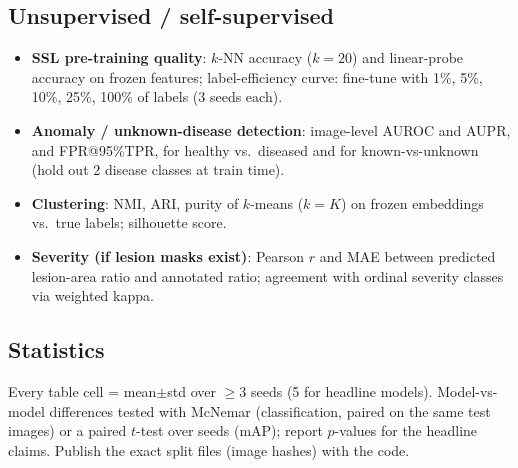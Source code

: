 \subsection{Unsupervised / self-supervised}
\begin{itemize}
  \item \textbf{SSL pre-training quality}: $k$-NN accuracy ($k{=}20$) and linear-probe accuracy on frozen features; label-efficiency curve: fine-tune with 1\%, 5\%, 10\%, 25\%, 100\% of labels (3 seeds each).
  \item \textbf{Anomaly / unknown-disease detection}: image-level AUROC and AUPR, and FPR@95\%TPR, for healthy vs.\ diseased and for known-vs-unknown (hold out 2 disease classes at train time).
  \item \textbf{Clustering}: NMI, ARI, purity of $k$-means ($k{=}K$) on frozen embeddings vs.\ true labels; silhouette score.
  \item \textbf{Severity (if lesion masks exist)}: Pearson $r$ and MAE between predicted lesion-area ratio and annotated ratio; agreement with ordinal severity classes via weighted kappa.
\end{itemize}

\subsection{Statistics}
Every table cell = mean$\pm$std over $\ge 3$ seeds (5 for headline models). Model-vs-model differences tested with McNemar (classification, paired on the same test images) or a paired $t$-test over seeds (mAP); report $p$-values for the headline claims. Publish the exact split files (image hashes) with the code.
